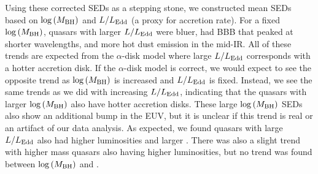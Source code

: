 Using these corrected SEDs as a stepping stone, we constructed mean SEDs based on $\log{(M_{\rm BH})}$ and $L/L_{\rm Edd}$ (a proxy for accretion rate).
For a fixed $\log{(M_{\rm BH})}$, quasars with larger $L/L_{\rm Edd}$ were bluer, had BBB that peaked at shorter wavelengths, and more hot dust emission in the mid-IR.  All of these trends are expected from the $\alpha$-disk model where large $L/L_{\rm Edd}$ corresponds with a hotter accretion disk.
If the $\alpha$-disk model is correct, we would expect to see the opposite trend as $\log{(M_{\rm BH})}$ is increased and $L/L_{\rm Edd}$ is fixed.  Instead, we see the same trends as we did with increasing $L/L_{\rm Edd}$, indicating that the quasars with larger $\log{(M_{\rm BH})}$ also have hotter accretion disks.
These large $\log{(M_{\rm BH})}$ SEDs also show an additional bump in the EUV, but it is unclear if this trend is real or an artifact of our data analysis.
As expected, we found quasars with large $L/L_{\rm Edd}$ also had higher luminosities and larger \bctwofive.  There was also a slight trend with higher mass quasars also having higher luminosities, but no trend was found between $\log{(M_{\rm BH})}$ and \bctwofive.
